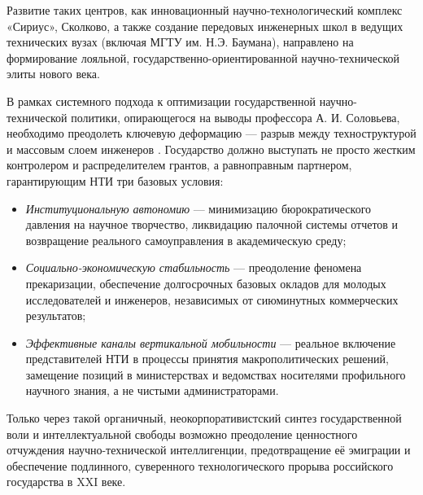 Развитие таких центров, как инновационный научно-технологический комплекс «Сириус», Сколково, а также создание передовых инженерных школ в ведущих технических вузах (включая МГТУ им. Н.Э. Баумана), направлено на формирование лояльной, государственно-ориентированной научно-технической элиты нового века.

В рамках системного подхода к оптимизации государственной научно-технической политики, опирающегося на выводы профессора А. И. Соловьева, необходимо преодолеть ключевую деформацию --- разрыв между техноструктурой и массовым слоем инженеров \cite{Solovyev}. Государство должно выступать не просто жестким контролером и распределителем грантов, а равноправным партнером, гарантирующим НТИ три базовых условия:
\begin{itemize}
    \item \textit{Институциональную автономию} --- минимизацию бюрократического давления на научное творчество, ликвидацию палочной системы отчетов и возвращение реального самоуправления в академическую среду;
    \item \textit{Социально-экономическую стабильность} --- преодоление феномена прекаризации, обеспечение долгосрочных базовых окладов для молодых исследователей и инженеров, независимых от сиюминутных коммерческих результатов;
    \item \textit{Эффективные каналы вертикальной мобильности} --- реальное включение представителей НТИ в процессы принятия макрополитических решений, замещение позиций в министерствах и ведомствах носителями профильного научного знания, а не чистыми администраторами.
\end{itemize}
Только через такой органичный, неокорпоративистский синтез государственной воли и интеллектуальной свободы возможно преодоление ценностного отчуждения научно-технической интеллигенции, предотвращение её эмиграции и обеспечение подлинного, суверенного технологического прорыва российского государства в XXI веке.
